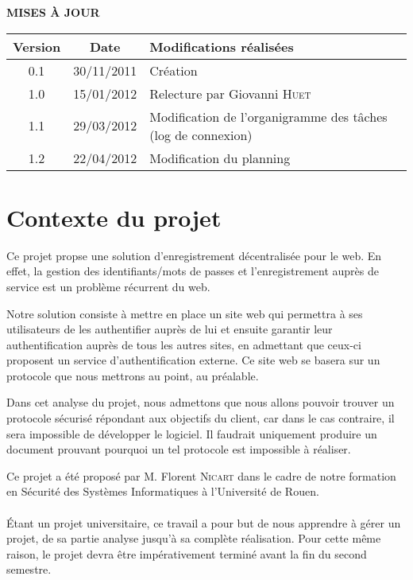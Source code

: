 \documentclass[a4paper,11pt,french]{article}
\begin{document}
\makeFirstPage
\clearpage
\vspace*{1cm}
\begin{center}
\textbf{\huge{MISES À JOUR}}\\
\vspace*{3cm}
	\begin{tabularx}{16cm}{|c|c|X|}
	\hline
	\bfseries{Version} & \bfseries{Date} & \bfseries{Modifications réalisées}\\
	\hline
	0.1 & 30/11/2011 & Création\\
	\hline
	 1.0 & 15/01/2012 & Relecture par Giovanni \textsc{Huet}\\
	\hline
	1.1 & 29/03/2012 & Modification de l'organigramme des tâches (log de
connexion) \\
	\hline
	1.2 & 22/04/2012 & Modification du planning \\
	\hline
	\end{tabularx}
\end{center}

\clearpage
\tableofcontents
\clearpage

\section{Contexte du projet}
Ce projet propse une solution d'enregistrement décentralisée pour le web. 
En effet, la gestion des identifiants/mots de passes et l'enregistrement
auprès de service est un problème récurrent du web. 

Notre solution consiste à mettre en place un site web qui permettra 
à ses utilisateurs de les authentifier auprès de lui et ensuite garantir
leur authentification auprès de tous les autres sites, en admettant que ceux-ci
proposent un service d'authentification externe. Ce site web se basera sur un
protocole que nous mettrons au point, au préalable.

Dans cet analyse du projet, nous admettons que nous allons pouvoir trouver un
protocole sécurisé répondant aux objectifs du client, car dans le cas contraire,
il sera impossible de développer le logiciel. Il faudrait uniquement produire un
document prouvant pourquoi un tel protocole est impossible à réaliser.

Ce projet a été proposé par M. Florent \textsc{Nicart} dans le cadre de notre
formation en Sécurité des Systèmes Informatiques à l'Université de Rouen.

\paragraph{}
Étant un projet universitaire, ce travail a pour but de nous apprendre
à gérer un projet, de sa partie analyse jusqu'à sa complète réalisation. Pour
cette même raison, le projet devra être impérativement terminé avant la fin du
second semestre.
\end{document}

